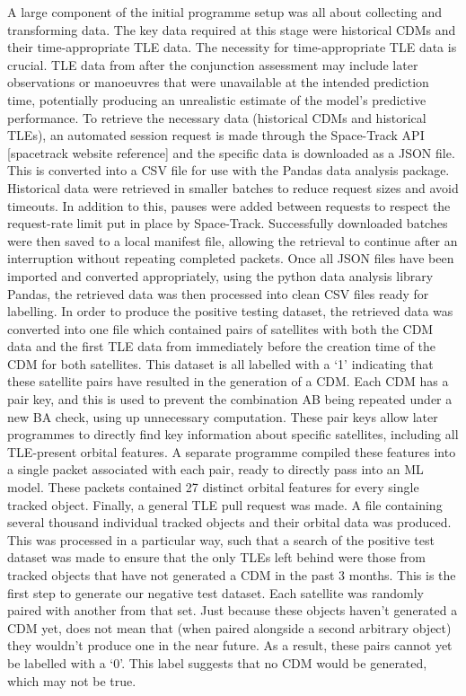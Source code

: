\documentclass[letterpaper,11pt,leqno]{article}
\begin{document}
A large component of the initial programme setup was all about collecting and transforming data. The key data required at this stage were historical CDMs and their time-appropriate TLE data. The necessity for time-appropriate TLE data is crucial. TLE data from after the conjunction assessment may include later observations or manoeuvres that were unavailable at the intended prediction time, potentially producing an unrealistic estimate of the model’s predictive performance.
To retrieve the necessary data (historical CDMs and historical TLEs), an automated session request is made through the Space-Track API [spacetrack website reference] and the specific data is downloaded as a JSON file. This is converted into a CSV file for use with the Pandas data analysis package. Historical data were retrieved in smaller batches to reduce request sizes and avoid timeouts. In addition to this, pauses were added between requests to respect the request-rate limit put in place by Space-Track. Successfully downloaded batches were then saved to a local manifest file, allowing the retrieval to continue after an interruption without repeating completed packets. 
Once all JSON files have been imported and converted appropriately, using the python data analysis library Pandas, the retrieved data was then processed into clean CSV files ready for labelling. In order to produce the positive testing dataset, the retrieved data was converted into one file which contained pairs of satellites with both the CDM data and the first TLE data from immediately before the creation time of the CDM for both satellites. This dataset is all labelled with a ‘1’ indicating that these satellite pairs have resulted in the generation of a CDM. 
Each CDM has a pair key, and this is used to prevent the combination AB being repeated under a new BA check, using up unnecessary computation. These pair keys allow later programmes to directly find key information about specific satellites, including all TLE-present orbital features. A separate programme compiled these features into a single packet associated with each pair, ready to directly pass into an ML model. These packets contained 27 distinct orbital features for every single tracked object. 
Finally, a general TLE pull request was made. A file containing several thousand individual tracked objects and their orbital data was produced. This was processed in a particular way, such that a search of the positive test dataset was made to ensure that the only TLEs left behind were those from tracked objects that have not generated a CDM in the past 3 months. This is the first step to generate our negative test dataset. Each satellite was randomly paired with another from that set. Just because these objects haven’t generated a CDM yet, does not mean that (when paired alongside a second arbitrary object) they wouldn’t produce one in the near future. As a result, these pairs cannot yet be labelled with a ‘0’. This label suggests that no CDM would be generated, which may not be true.
\end{document}
